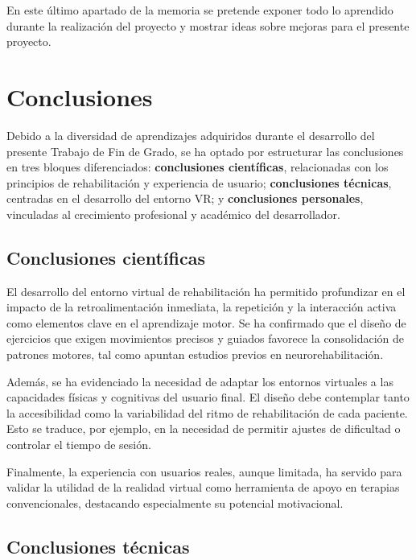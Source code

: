 
En este último apartado de la memoria se pretende exponer todo lo aprendido durante la realización del proyecto y mostrar ideas sobre mejoras para el presente proyecto.

\section{Conclusiones}

Debido a la diversidad de aprendizajes adquiridos durante el desarrollo del presente Trabajo de Fin de Grado, se ha optado por estructurar las conclusiones en tres bloques diferenciados: \textbf{conclusiones científicas}, relacionadas con los principios de rehabilitación y experiencia de usuario; \textbf{conclusiones técnicas}, centradas en el desarrollo del entorno VR; y \textbf{conclusiones personales}, vinculadas al crecimiento profesional y académico del desarrollador.

\subsection*{Conclusiones científicas}

El desarrollo del entorno virtual de rehabilitación ha permitido profundizar en el impacto de la retroalimentación inmediata, la repetición y la interacción activa como elementos clave en el aprendizaje motor. Se ha confirmado que el diseño de ejercicios que exigen movimientos precisos y guiados favorece la consolidación de patrones motores, tal como apuntan estudios previos en neurorehabilitación.

Además, se ha evidenciado la necesidad de adaptar los entornos virtuales a las capacidades físicas y cognitivas del usuario final. El diseño debe contemplar tanto la accesibilidad como la variabilidad del ritmo de rehabilitación de cada paciente. Esto se traduce, por ejemplo, en la necesidad de permitir ajustes de dificultad o controlar el tiempo de sesión.

Finalmente, la experiencia con usuarios reales, aunque limitada, ha servido para validar la utilidad de la realidad virtual como herramienta de apoyo en terapias convencionales, destacando especialmente su potencial motivacional.

\subsection*{Conclusiones técnicas}


